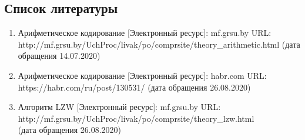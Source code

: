 \documentclass[12pt]{article}
\begin{document}
	\subsection*{Список литературы}
	\begin{enumerate}
		\item Арифметическое кодирование [Электронный ресурс]: mf.grsu.by URL:\\ http://mf.grsu.by/UchProc/livak/po/comprsite/theory\_arithmetic.html (дата обращения 14.07.2020)
		\item Арифметическое кодирование [Электронный ресурс]: habr.com URL:\\ https://habr.com/ru/post/130531/ (дата обращения 26.08.2020)
		\item Алгоритм LZW [Электронный ресурс]: mf.grsu.by URL:\\ http://mf.grsu.by/UchProc/livak/po/comprsite/theory\_lzw.html \\(дата обращения 26.08.2020)
	\end{enumerate}
\end{document}
